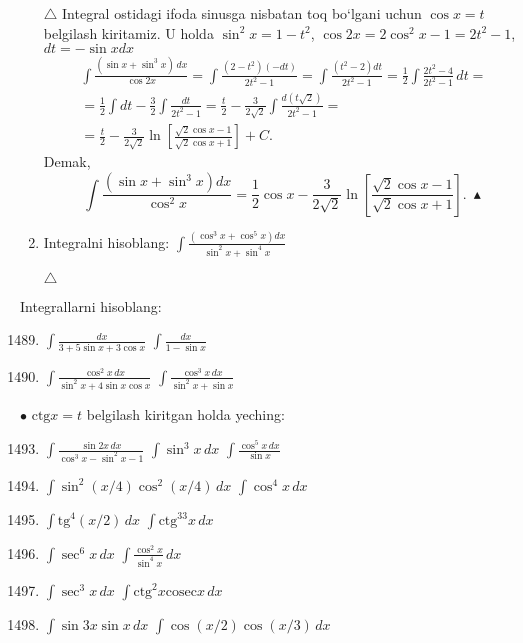 \begin{enumerate}
$\triangle$ Integral ostidagi ifoda sinusga nisbatan toq bo`lgani uchun $\cos x=t$ belgilash kiritamiz. U holda $\sin^2 x=1-t^2$, $\cos 2x=2\cos^2 x-1=2t^2-1$, $dt=-\sin xdx$
\begin{multline*}
	\int\frac{(\sin x+\sin^3 x)\,dx}{\cos 2x}=\int\frac{(2-t^2)(-dt)}{2t^2-1}=\int\frac{(t^2-2)dt}{2t^2-1}=\frac{1}{2}\int\frac{2t^2-4}{2t^2-1}\,dt=\\
	=\frac{1}{2}\int dt-\frac{3}{2}\int\frac{dt}{2t^2-1}=\frac{t}{2}-\frac{3}{2\sqrt{2}}\int\frac{d(t\sqrt{2})}{2t^2-1}=\\
	=\frac{t}{2}-\frac{3}{2\sqrt{2}}\ln\left[ \frac{\sqrt{2}\cos x-1}{\sqrt{2}\cos x+1}\right]+C.
\end{multline*}
Demak,
$$\int\frac{(\sin x+\sin^3 x)dx}{\cos^2 x}=\frac{1}{2}\cos x-\frac{3}{2\sqrt{2}}\ln\left[ \frac{\sqrt{2}\cos x-1}{\sqrt{2}\cos x+1}\right].\ \blacktriangle$$


\item Integralni hisoblang: $\int\frac{(\cos^3 x+\cos^5 x)dx}{\sin^2 x+\sin^4 x}$

$\triangle$ 
\end{enumerate}

Integrallarni hisoblang:
\begin{enumerate}\setcounter{enumi}{1488}
	\item $\int\frac{dx}{3+5\sin x+3\cos x}$
	\inlineitem $\int\frac{dx}{1-\sin x}$
	
	\item $\int\frac{\cos^2x\,dx}{\sin^2x+4\sin x\cos x}$
	\inlineitem $\int\frac{\cos^3x\,dx}{\sin^2x+\sin x}$
\end{enumerate}
$\bullet$ $\textrm{ctg}x=t$ belgilash kiritgan holda yeching:
\begin{enumerate}\setcounter{enumi}{1492}
	\item $\int\frac{\sin 2x\,dx}{\cos^3x-\sin^2x-1}$
	\inlineitem $\int\sin^3x\,dx$
	\inlineitem $\int\frac{\cos^5x\,dx}{\sin x}$
	
	\item $\int\sin^2(x/4)\cos^2(x/4)\,dx$
	\inlineitem $\int\cos^4x\,dx$
	
	\item $\int\textrm{tg}^4(x/2)\,dx$
	\inlineitem $\int\textrm{ctg}^33x\,dx$
	
	\item $\int\sec^6x\,dx$
	\inlineitem $\int\frac{\cos^2x}{\sin^4x}\,dx$
	
	\item $\int\sec^3x\,dx$
	\inlineitem $\int\textrm{ctg}^2x\textrm{cosec}x\,dx$
	
	\item $\int\sin 3x\sin x\,dx$
	\inlineitem $\int\cos(x/2)\cos(x/3)\,dx$	
\end{enumerate}

